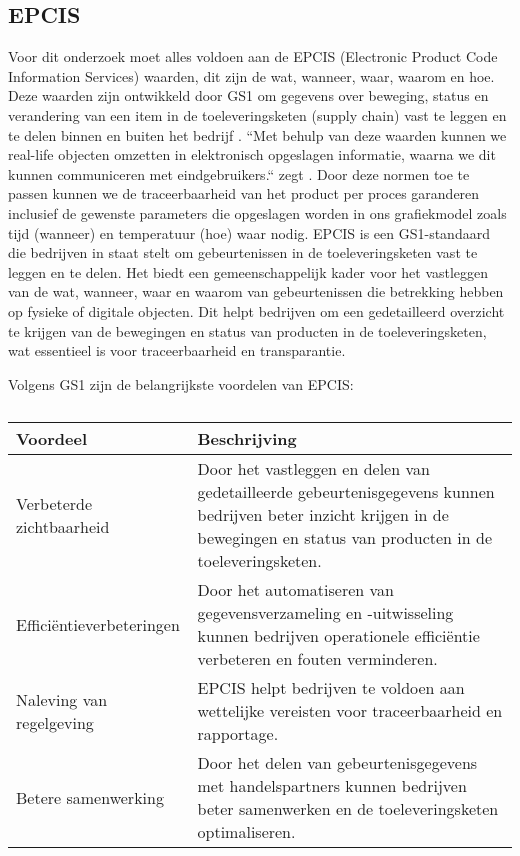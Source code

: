 \subsection{EPCIS}
Voor dit onderzoek moet alles voldoen aan de EPCIS (Electronic Product Code Information Services) waarden, dit zijn de wat, wanneer, waar, waarom en hoe. 
Deze waarden zijn ontwikkeld door GS1 om gegevens over beweging, status en verandering van een item in de toeleveringsketen (supply chain) vast te leggen en te delen binnen en buiten het bedrijf \autocite{Devins}.
``Met behulp van deze waarden kunnen we real-life objecten omzetten in elektronisch opgeslagen informatie, waarna we dit kunnen communiceren met eindgebruikers.`` zegt \textcite{Devins}.
Door deze normen toe te passen kunnen we de traceerbaarheid van het product per proces garanderen inclusief de gewenste parameters die opgeslagen worden in ons grafiekmodel zoals tijd (wanneer) en temperatuur (hoe) waar nodig.
\bigbreak
EPCIS is een GS1-standaard die bedrijven in staat stelt om gebeurtenissen in de toeleveringsketen vast te leggen en te delen. Het biedt een gemeenschappelijk kader voor het vastleggen van de wat, wanneer, waar en waarom van gebeurtenissen die betrekking hebben op fysieke of digitale objecten. Dit helpt bedrijven om een gedetailleerd overzicht te krijgen van de bewegingen en status van producten in de toeleveringsketen, wat essentieel is voor traceerbaarheid en transparantie.

Volgens GS1 \autocite{GS12025} zijn de belangrijkste voordelen van EPCIS:
\begin{table}[H]
    \centering
     \begin{tabular}{lp{}}
          \toprule
          \textbf{Voordeel} & \textbf{Beschrijving} \\
          \toprule
          Verbeterde zichtbaarheid & Door het vastleggen en delen van gedetailleerde gebeurtenisgegevens kunnen bedrijven beter inzicht krijgen in de bewegingen en status van producten in de toeleveringsketen. \\
          \midrule
          Efficiëntieverbeteringen & Door het automatiseren van gegevensverzameling en -uitwisseling kunnen bedrijven operationele efficiëntie verbeteren en fouten verminderen. \\
          \midrule
          Naleving van regelgeving & EPCIS helpt bedrijven te voldoen aan wettelijke vereisten voor traceerbaarheid en rapportage. \\
          \midrule
          Betere samenwerking & Door het delen van gebeurtenisgegevens met handelspartners kunnen bedrijven beter samenwerken en de toeleveringsketen optimaliseren. \\
          \bottomrule
     \end{tabular}
     \caption[Belangrijkste voordelen van EPCIS volgens GS1]{\label{tab:epcis-voordelen}}
\end{table}

